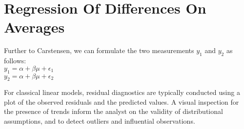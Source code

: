 \documentclass[12pt, a4paper]{report}
\theoremstyle{plain}
\theoremstyle{definition}
\theoremstyle{remark}
\begin{document}
\section{Regression Of Differences On Averages}
Further to Carstensen, we can formulate the two measurements
$y_{1}$ and $y_{2}$ as follows:
\\
$y_{1} = \alpha + \beta\mu + \epsilon_{1}$
\\
$y_{2} = \alpha + \beta\mu + \epsilon_{2}$








For classical linear models, residual diagnostics are typically conducted using a plot of the observed residuals and the predicted values. A visual inspection for the presence of trends inform the analyst on the validity of distributional assumptions, and to detect outliers and influential observations.

%
%
%
%
%
%
%
%
\end{document}
